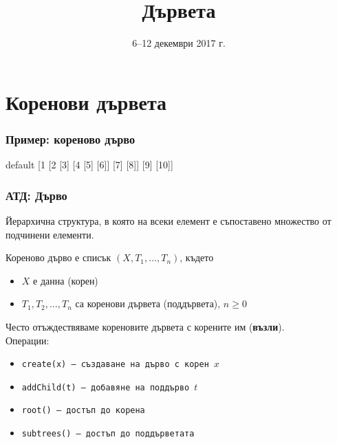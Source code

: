 \documentclass{beamer}
\title{Дървета}
\date{6--12 декември 2017 г.}
\newcommand{\sampletree}{%
  \begin{forest} default
    [1 [2 [3] [4 [5] [6]] [7] [8]] [9] [10]]
  \end{forest}%
}
\begin{document}
\begin{frame}
  \titlepage
\end{frame}

\section{Коренови дървета}

\begin{frame}
  \frametitle{Пример: кореново дърво}
  \begin{center}
    \sampletree
  \end{center}
\end{frame}

\begin{frame}
  \frametitle{АТД: Дърво}
  Йерархична структура, в която на всеки елемент е съпоставено множество от подчинени елементи.
  \begin{definition}
    Кореново дърво е списък $(X, T_1, \ldots, T_n)$, където
    \begin{itemize}
    \item $X$ е данна (корен)
    \item $T_1, T_2, \ldots, T_n$ са коренови дървета (поддървета)\pause, \alert{$n\geq 0$}
    \end{itemize}
  \end{definition}
  \pause
  Често отъждествяваме кореновите дървета с корените им (\textbf{възли}).\\
  \pause
  Операции:
  \begin{itemize}
  \item \tt{create(x)} --- създаване на дърво с корен $x$
  \item \tt{addChild(t)} --- добавяне на поддърво $t$
  \item \tt{root()} --- достъп до корена
  \item \tt{subtrees()} --- достъп до поддърветата
  \end{itemize}
\end{frame}
\end{document}
